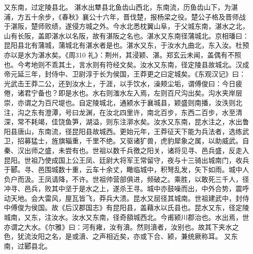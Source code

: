 \documentclass[12pt,UTF8]{ctexbook}
\begin{document}
又东南，过定陵县北。
湛水出犨县北鱼齿山西北，东南流，历鱼齿山下，为湛浦，方五十余步，《春秋》襄公十六年，晋伐楚，报杨梁之役。楚公子格及晋师战于湛阪，楚师败绩，遂侵方城之外。今水北悉枕翼山阜，于父城东南，湛水之北，山有长阪，盖即湛水以名阪，故有湛阪之名也。湛水又东南径蒲城北。京相璠曰：昆阳县北有蒲城，蒲城北有湛水者是也。湛水又东，于汝水九曲北，东入汝。杜预亦以是水为湛水矣。《周310 礼》：荆州，其浸颖、湛。郑玄云未闻，盖偶有不照也。今考地则不乖其土，言水则有符经文矣。汝水又东南，径定陵县故城北。汉成帝元延三年，封侍中、卫尉淳于长为侯国，王莽更之曰定城矣。《东观汉记》曰：光武击王莽二公，还到汝水上，于涯，以手饮水，澡颊尘垢，谓傅俊曰：今日疲倦，诸君宁备也？即是水也。水右则滍水左入焉，左则百尺沟出矣。沟水夹岸层崇，亦谓之为百尺堤也。自定陵城北，通颍水于襄城县，颖盛则南播，汝泆则北注，沟之东有澄潭，号曰龙渊，在汝北四里许，南北百步，东西二百步，水至清深，常不耗竭，佳饶鱼笋，湖溢，则东注漷水矣。汝水又东南，昆水注之，水出鲁阳县唐山，东南流，径昆阳县故城西。更始元年，王莽征天下能为兵法者，选练武卫，招募猛士，旌旗辎重，千里不绝。又驱诸犷兽，虎豹犀象之属，以助威武。自秦、汉出师之盛，未尝有也。世祖以数千兵徼之阳关，诸将见寻、邑兵盛，反走入昆阳。世祖乃使成国上公王凤、廷尉大将军王常留守，夜与十三骑出城南门，收兵于郾。寻、邑围城数十重，云车十余丈，瞰临城中，积弩乱发，矢下如雨。城中人负户而汲。王凤请降，不许。世祖帅营部俱进，频破之。乘胜，以敢死三千人，径冲寻、邑兵，败其中坚于是水之上，遂杀王寻。城中亦鼓噪而出，中外合势，震呼动天地。会大雷风，屋瓦皆飞，莽兵大溃。昆水又屈径其城南。世祖建武中，封侍中傅俊为侯国。故《后汉郡国志》有昆阳县，盖藉水以氏县也。昆水又东，径定陵城南，又东，注汝水。汝水又东南，径奇頟城西北。今甫颍川郡治也。水出焉，世亦谓之大水。《尔雅》曰：河有雍，汝有濆。然则濆者，汝别也。故其下夹水之色，犹流汝阳之名，是或濆、之声相近矣，亦或下合、颍，兼统厥称耳。
又东南，过郾县北。
\end{document}
